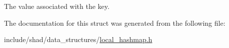 The value associated with the key. 



The documentation for this struct was generated from the following file\-:\begin{DoxyCompactItemize}
\item 
include/shad/data\-\_\-structures/\hyperlink{local__hashmap_8h}{local\-\_\-hashmap.\-h}\end{DoxyCompactItemize}
